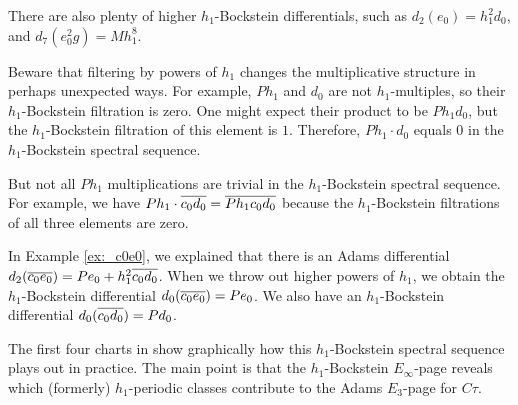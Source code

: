 There are also plenty of higher $h_1$-Bockstein differentials,
such as $d_2(e_0) = h_1^2 d_0$, and
$d_7(e_0^2 g) = M h_1^8$.

\begin{remark}
Beware that filtering by powers of $h_1$ changes the multiplicative
structure in perhaps unexpected ways.
For example, $P h_1$ and $d_0$ are not $h_1$-multiples, so their
$h_1$-Bockstein filtration is zero.  One might expect their
product to be $P h_1 d_0$, but the 
$h_1$-Bockstein filtration of this element is $1$.
Therefore, $P h_1 \cdot d_0$ equals $0$ in the
$h_1$-Bockstein spectral sequence.

But not all $P h_1$ multiplications are trivial in the
$h_1$-Bockstein spectral sequence.  For example, we have
$P h_1 \cdot \overline{c_0 d_0} = \overline{P h_1 c_0 d_0}$ because
the $h_1$-Bockstein filtrations of all three elements are zero.
\end{remark}

In Example \ref{ex:_c0e0}, we explained that there is an
Adams differential $d_2(\overline{c_0 e_0}) = P e_0 + h_1^2 \overline{c_0 d_0}$.
When we throw out higher powers of $h_1$, we obtain
the $h_1$-Bockstein differential $d_0(\overline{c_0 e_0}) = P e_0$.
We also have an $h_1$-Bockstein differential
$d_0(\overline{c_0 d_0}) = P d_0$.

The first four charts in \cite{IWX19} show graphically how this 
$h_1$-Bockstein spectral sequence plays out in practice.
The main point is that the $h_1$-Bockstein
$E_\infty$-page reveals which (formerly) $h_1$-periodic classes
contribute to the Adams $E_3$-page for $C\tau$.
